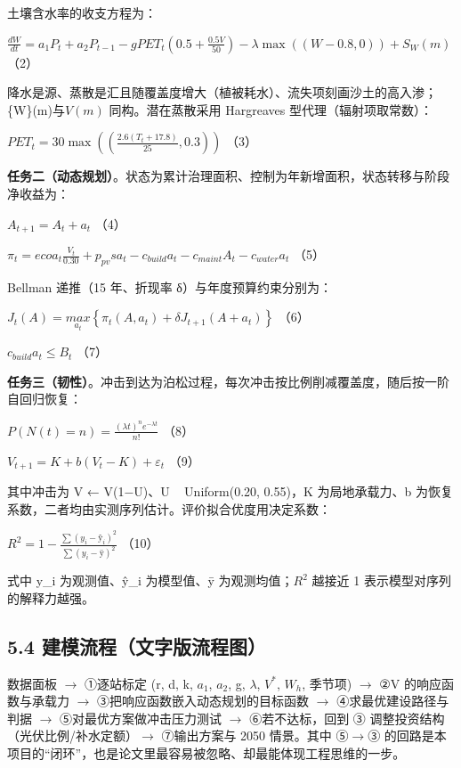 \documentclass[11pt,a4paper]{ctexart}
\begin{document}
土壤含水率的收支方程为：

$\frac{dW}{dt}=a_{1}P_{t}+a_{2}P_{t-1}-g{PET}_{t}\left(0.5+\frac{0.5V}{50}\right)-{\lambda}\max\left(\left(W-0.8,0\right)\right)+S_{W}\left(m\right)​$  （2）

降水是源、蒸散是汇且随覆盖度增大（植被耗水）、流失项刻画沙土的高入渗；\{W\}(m)$与 V(m)$ 同构。潜在蒸散采用 Hargreaves 型代理（辐射项取常数）：

${PET}_{t}=30\max\left(\left(\frac{2.6\left(T_{t}+17.8\right)}{25},0.3\right)\right)$  （3）

\textbf{任务二（动态规划）}。状态为累计治理面积、控制为年新增面积，状态转移与阶段净收益为：

$A_{t+1}=A_{t}+a_{t}$  （4）

${{\pi}}_{t}=ecoa_{t}\frac{V_{t}}{0.30}+p_{pv}sa_{t}-c_{build}a_{t}-c_{maint}A_{t}-c_{water}a_{t}$  （5）

Bellman 递推（15 年、折现率 δ）与年度预算约束分别为：

$J_{t}\left(A\right)=\underset{a_{t}}{max}\left\{{{\pi}}_{t}\left(A,a_{t}\right)+{\delta}J_{t+1}\left(A+a_{t}\right)\right\}$  （6）

$c_{build}a_{t}{\le}B_{t}$  （7）

\textbf{任务三（韧性）}。冲击到达为泊松过程，每次冲击按比例削减覆盖度，随后按一阶自回归恢复：

$P\left(N\left(t\right)=n\right)=\frac{{\left({\lambda}t\right)}^{n}e^{-{\lambda}t}}{n!}$  （8）

$V_{t+1}=K+b\left(V_{t}-K\right)+{{\varepsilon}}_{t}$  （9）

其中冲击为 V ← V(1−U)、U ~ Uniform(0.20, 0.55)，K 为局地承载力、b 为恢复系数，二者均由实测序列估计。评价拟合优度用决定系数：

$R^{2}=1-\frac{{\sum}{\left(y_{i}-ŷ_{i}\right)}^{2}}{{\sum}{\left(y_{i}-ȳ\right)}^{2}}$  （10）

式中 y\_i 为观测值、ŷ\_i 为模型值、ȳ 为观测均值；$R^{2}$ 越接近 1 表示模型对序列的解释力越强。


\subsection*{5.4 建模流程（文字版流程图）}
数据面板 $\to$ ①逐站标定 (r, d, k, $a_{1}$, $a_{2}$, g, ${\lambda}$, $V^{*}$, $W_{h}$, 季节项) $\to$ ②V 的响应函数与承载力 $\to$ ③把响应函数嵌入动态规划的目标函数 $\to$ ④求最优建设路径与判据 $\to$ ⑤对最优方案做冲击压力测试 $\to$ ⑥若不达标，回到 ③ 调整投资结构（光伏比例/补水定额）$\to$ ⑦输出方案与 2050 情景。其中 ⑤$\to$③ 的回路是本项目的“闭环”，也是论文里最容易被忽略、却最能体现工程思维的一步。
\end{document}
